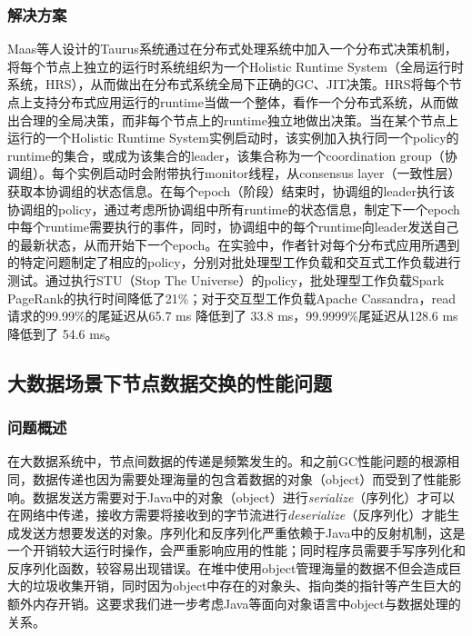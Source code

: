 \documentclass[lang=cn,12pt,a4paper,cite=authoryear]{elegantpaper}
\begin{document}
\subsubsection{解决方案}
Maas等人设计的Taurus\cite{DBLP:conf/asplos/MaasA0K16}系统通过在分布式处理系统中加入一个分布式决策机制，将每个节点上独立的运行时系统组织为一个Holistic Runtime System（全局运行时系统，HRS），从而做出在分布式系统全局下正确的GC、JIT决策。HRS将每个节点上支持分布式应用运行的runtime当做一个整体，看作一个分布式系统，从而做出合理的全局决策，而非每个节点上的runtime独立地做出决策。当在某个节点上运行的一个Holistic Runtime System实例启动时，该实例加入执行同一个policy的runtime的集合，或成为该集合的leader，该集合称为一个coordination group（协调组）。每个实例启动时会附带执行monitor线程，从consensus layer（一致性层）获取本协调组的状态信息。在每个epoch（阶段）结束时，协调组的leader执行该协调组的policy，通过考虑所协调组中所有runtime的状态信息，制定下一个epoch中每个runtime需要执行的事件，同时，协调组中的每个runtime向leader发送自己的最新状态，从而开始下一个epoch。在实验中，作者针对每个分布式应用所遇到的特定问题制定了相应的policy，分别对批处理型工作负载和交互式工作负载进行测试。通过执行STU（Stop The Universe）的policy，批处理型工作负载Spark PageRank的执行时间降低了21\%；对于交互型工作负载Apache Cassandra，read请求的99.99\%的尾延迟从65.7 ms 降低到了 33.8 ms，99.9999\%尾延迟从128.6 ms 降低到了 54.6 ms。

\subsection{大数据场景下节点数据交换的性能问题}
\subsubsection{问题概述}
在大数据系统中，节点间数据的传递是频繁发生的。和之前GC性能问题的根源相同，数据传递也因为需要处理海量的包含着数据的对象（object）而受到了性能影响。数据发送方需要对于Java中的对象（object）进行\textit{serialize}（序列化）才可以在网络中传递，接收方需要将接收到的字节流进行\textit{deserialize}（反序列化）才能生成发送方想要发送的对象。序列化和反序列化严重依赖于Java中的反射机制，这是一个开销较大运行时操作，会严重影响应用的性能；同时程序员需要手写序列化和反序列化函数，较容易出现错误。在堆中使用object管理海量的数据不但会造成巨大的垃圾收集开销，同时因为object中存在的对象头、指向类的指针等产生巨大的额外内存开销。这要求我们进一步考虑Java等面向对象语言中object与数据处理的关系。
\end{document}
